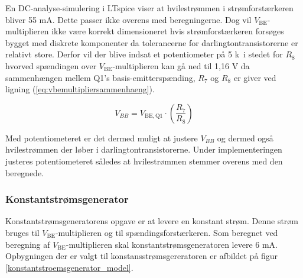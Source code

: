 En DC-analyse-simulering i LTspice viser at hvilestrømmen i strømforstærkeren bliver 55 mA. Dette passer ikke overens med beregningerne. Dog vil $V_\mathrm{BE}$-multiplieren ikke være korrekt dimensioneret hvis strømforstærkeren forsøges bygget med diskrete komponenter da tolerancerne for darlingtontransistorerne er relativt store. Derfor vil der blive indsat et potentiometer på 5 k\ohm~i stedet for $R_8$ hvorved spændingen over $V_\mathrm{BE}$-multiplieren kan gå ned til 1,16 V da sammenhængen mellem Q1's basis-emitterspænding, $R_7$ og $R_8$ er giver ved ligning (\ref{eq:vbemultipliersammenhaeng}).

\begin{equation}
V_{BB}=V_\mathrm{BE,Q1} \cdot \left( \frac{R_7}{R_8} \right)
\label{eq:vbemultipliersammenhaeng}
\end{equation}

Med potentiometeret er det dermed muligt at justere $V_{BB}$ og dermed også hvilestrømmen der løber i darlingtontransistorerne. Under implementeringen justeres potentiometeret således at hvilestrømmen stemmer overens med den beregnede.

\subsubsection*{Konstantstrømsgenerator}
Konstantstrømsgeneratorens opgave er at levere en konstant strøm. Denne strøm bruges til $V_\mathrm{BE}$-multiplieren og til spændingsforstærkeren. Som beregnet ved beregning af $V_{\mathrm{BE}}$-multiplieren skal konstantstrømsgeneratoren levere 6 mA. Opbygningen der er valgt til konstansstrømsgereratoren er afbildet på figur \ref{konstantstroemsgenerator_model}.

